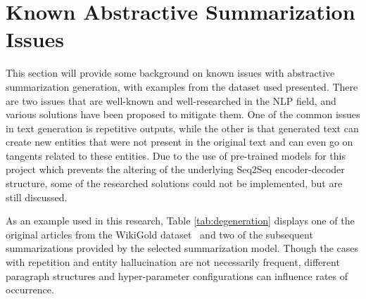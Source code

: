 \documentclass[12pt]{report}
\begin{document}
 
    \section{Known Abstractive Summarization Issues}
        This section will provide some background on known issues with abstractive summarization generation, with examples from the dataset used presented. There are two issues that are well-known and well-researched in the NLP field, and various solutions have been proposed to mitigate them. One of the common issues in text generation is repetitive outputs, while the other is that generated text can create new entities that were not present in the original text and can even go on tangents related to these entities. Due to the use of pre-trained models for this project which prevents the altering of the underlying Seq2Seq encoder-decoder structure, some of the researched solutions could not be implemented, but are still discussed.
        
         As an example used in this research, Table \ref{tab:degeneration} displays one of the original articles from the WikiGold dataset~\cite{data_source} and two of the subsequent summarizations provided by the selected summarization model. Though the cases with repetition and entity hallucination are not necessarily frequent, different paragraph structures and hyper-parameter configurations can influence rates of occurrence.
         
\end{document}
